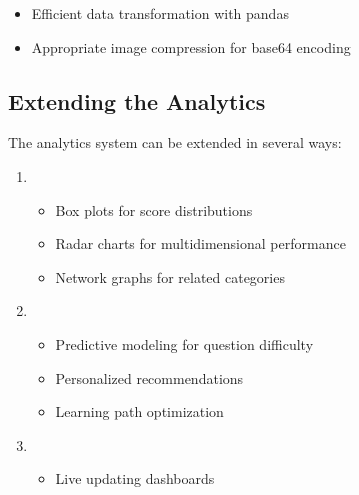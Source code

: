 \documentclass[letterpaper,10pt,english]{sphinxmanual}
\begin{document}
\begin{enumerate}
\begin{itemize}
\item {} 
\sphinxAtStartPar
Efficient data transformation with pandas

\item {} 
\sphinxAtStartPar
Appropriate image compression for base64 encoding

\end{itemize}

\end{enumerate}


\subsection{Extending the Analytics}
\label{\detokenize{analytics:extending-the-analytics}}
\sphinxAtStartPar
The analytics system can be extended in several ways:
\begin{enumerate}
%
\item {} 
\sphinxAtStartPar
{}
\begin{itemize}
\item {} 
\sphinxAtStartPar
Box plots for score distributions

\item {} 
\sphinxAtStartPar
Radar charts for multi\sphinxhyphen{}dimensional performance

\item {} 
\sphinxAtStartPar
Network graphs for related categories

\end{itemize}

\item {} 
\sphinxAtStartPar
{}
\begin{itemize}
\item {} 
\sphinxAtStartPar
Predictive modeling for question difficulty

\item {} 
\sphinxAtStartPar
Personalized recommendations

\item {} 
\sphinxAtStartPar
Learning path optimization

\end{itemize}

\item {} 
\sphinxAtStartPar
{}
\begin{itemize}
\item {} 
\sphinxAtStartPar
Live updating dashboards


\end{itemize}
\end{enumerate}
\end{document}
